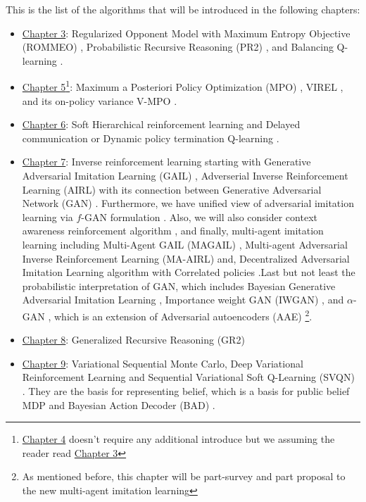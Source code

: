 \label{sec:chap2-other-algos}
This is the list of the algorithms that will be introduced in the following chapters: 
\begin{itemize}
    \item \hyperref[chapter:chap3]{Chapter 3}: Regularized Opponent Model with Maximum Entropy Objective (ROMMEO) \cite{tian2019regularized}, Probabilistic Recursive Reasoning (PR2) \cite{wen2019probabilistic}, and Balancing Q-learning \cite{grau2018balancing}.
    \item \hyperref[chapter:chap5]{Chapter 5}\footnote{\hyperref[chapter:chap4]{Chapter 4} doesn't require any additional introduce but we assuming the reader read \hyperref[chapter:chap3]{Chapter 3}}:  Maximum a Posteriori Policy Optimization (MPO) \cite{abdolmaleki2018maximum}, VIREL \cite{fellows2019virel}, and its on-policy variance V-MPO \cite{song2019v}. 
    \item \hyperref[chapter:chap6]{Chapter 6}: Soft Hierarchical reinforcement learning \cite{igl2019multitask, lobo2019soft} and Delayed communication or Dynamic policy termination Q-learning \cite{han2019multi}.
    \item \hyperref[chapter:chap7]{Chapter 7}: Inverse reinforcement learning starting with Generative Adversarial Imitation Learning (GAIL) \cite{ho2016generative}, Adverserial Inverse Reinforcement Learning (AIRL) \cite{fu2017learning} with its connection between Generative Adversarial Network (GAN) \cite{goodfellow2014generative, finn2016connection}. Furthermore, we have unified view of adversarial imitation learning via $f$-GAN \cite{nowozin2016f} formulation \cite{ghasemipour2019divergence, ke2019imitation}. Also, we will also consider context awareness reinforcement algorithm \cite{yu2019meta, rakelly2019efficient}, and finally, multi-agent imitation learning including Multi-Agent GAIL (MAGAIL) \cite{song2018multi}, Multi-agent Adversarial Inverse Reinforcement Learning (MA-AIRL) \cite{yu2019multi} and, Decentralized Adversarial Imitation Learning algorithm with Correlated policies \cite{liu2020multi}.Last but not least the probabilistic interpretation of GAN, which includes Bayesian Generative Adversarial Imitation Learning \cite{jeon2018bayesian}, Importance weight GAN (IWGAN) \cite{hu2017unifying}, and $\alpha$-GAN \cite{rosca2017variational}, which is an extension of Adversarial autoencoders (AAE) \cite{makhzani2015adversarial}\footnote{As mentioned before, this chapter will be part-survey and part proposal to the new multi-agent imitation learning}.
    \item \hyperref[chapter:chap8]{Chapter 8}: Generalized Recursive Reasoning (GR2) \cite{wen2019multi}
    \item \hyperref[chapter:chap9]{Chapter 9}: Variational Sequential Monte Carlo, Deep Variational Reinforcement Learning \cite{igl2018deep, shvechikovjoint} and Sequential Variational Soft Q-Learning (SVQN) \cite{huangsvqn}. They are the basis for representing belief, which is a basis for public belief MDP \cite{nayyar2013decentralized} and Bayesian Action Decoder (BAD) \cite{foerster2018bayesian}. 
\end{itemize}